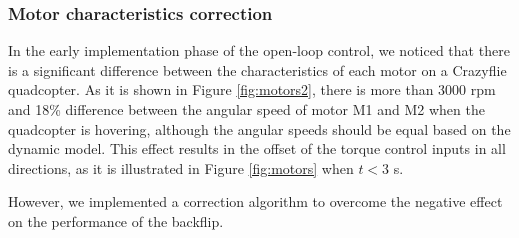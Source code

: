 \subsubsection{Motor characteristics correction}
In the early implementation phase of the open-loop control, we noticed that there is a significant difference between the characteristics of each motor on a Crazyflie quadcopter. As it is shown in Figure \ref{fig:motors2}, there is more than 3000 rpm and 18\% difference between the angular speed of motor M1 and M2 when the quadcopter is hovering, although the angular speeds should be equal based on the dynamic model. This effect results in the offset of the torque control inputs in all directions, as it is illustrated in Figure \ref{fig:motors} when $t<3$ s.

However, we implemented a correction algorithm to overcome the negative effect on the performance of the backflip. 

